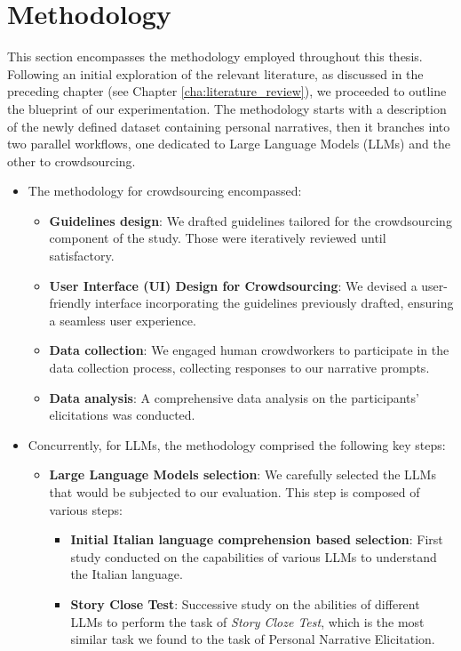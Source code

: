 \chapter{Methodology}
\label{cha:methodology}
This section encompasses the methodology employed throughout this thesis. Following an initial exploration of the relevant literature, as discussed in the preceding chapter (see Chapter \ref{cha:literature_review}), we proceeded to outline the blueprint of our experimentation. The methodology starts with a description of the newly defined dataset containing personal narratives, then it branches into two parallel workflows, one dedicated to Large Language Models (LLMs) and the other to crowdsourcing. 
\begin{itemize}
    \item The methodology for crowdsourcing encompassed:
        \begin{itemize}
            \item \textbf{Guidelines design}: We drafted guidelines tailored for the crowdsourcing component of the study. Those were iteratively reviewed until satisfactory.
            \item \textbf{User Interface (UI) Design for Crowdsourcing}: We devised a user-friendly interface incorporating the guidelines previously drafted, ensuring a seamless user experience.
            \item \textbf{Data collection}: We engaged human crowdworkers to participate in the data collection process, collecting responses to our narrative prompts.
            \item \textbf{Data analysis}: A comprehensive data analysis on the participants' elicitations was conducted.
        \end{itemize}
    \item Concurrently, for LLMs, the methodology comprised the following key steps:
        \begin{itemize}
            \item \textbf{Large Language Models selection}: We carefully selected the LLMs that would be subjected to our evaluation. This step is composed of various steps:
            \begin{itemize}
                \item \textbf{Initial Italian language comprehension based selection}: First study conducted on the capabilities of various LLMs to understand the Italian language.
                \item \textbf{Story Close Test}: Successive study on the abilities of different LLMs to perform the task of \emph{Story Cloze Test}, which is the most similar task we found to the task of Personal Narrative Elicitation.

\end{itemize}
\end{itemize}
\end{itemize}
